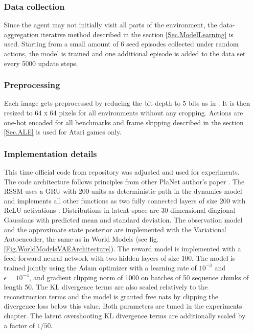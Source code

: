 \subsubsection{Data collection}

Since the agent may not initially visit all parts of the environment, the data-aggregation iterative method described in the section \ref{Sec.ModelLearning} is used. Starting from a small amount of 6 seed episodes collected under random actions, the model is trained and one additional episode is added to the data set every 5000 update steps.

\subsubsection{Preprocessing}

Each image gets preprocessed by reducing the bit depth to 5 bits as in \cite{Algo.Glow5bit}. It is then resized to 64 x 64 pixels for all environments without any cropping.
Actions are one-hot encoded for all benchmarks and frame skipping described in the section \ref{Sec.ALE} is used for Atari games only.

\subsubsection{Implementation details}

This time official code from repository \cite{Code.PlaNet} was adjusted and used for experiments. The code architecture follows principles from other PlaNet author's paper \cite{Code.TFAgents}.
The RSSM uses a GRU \cite{Algo.GRU} with 200 units as deterministic path in the dynamics model and implements all other functions as two fully connected layers of size 200 with ReLU activations \cite{Algo.ReLU}. Distributions in latent space are 30-dimensional diagional Gaussians with predicted mean and standard deviation.
The observation model and the approximate state posterior are implemented with the Variational Autoencoder, the same as in World Models (see fig.\ref{Fig.WorldModelsVAEArchitecture}). The reward model is implemented with a feed-forward neural network with two hidden layers of size 100.
The model is trained jointly using the Adam optimizer \cite{Algo.Adam} with a learning rate of $10^{-3}$ and $\epsilon = 10^{−4}$, and gradient clipping norm of 1000 on batches of 50 sequence chunks of length 50. The KL divergence terms are also scaled relatively to the reconstruction terms and the model is granted free nats by clipping the divergence loss below this value. Both parameters are tuned in the experiments chapter. The latent overshooting KL divergence terms are additionally scaled by a factor of $1/50$.

